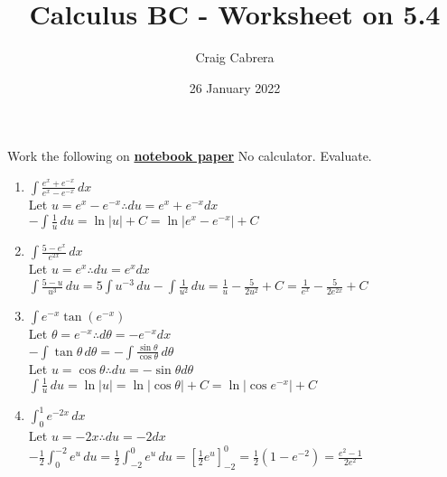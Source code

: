\documentclass[10pt, letterpaper]{report}
\title{Calculus BC - Worksheet on 5.4}
\author{Craig Cabrera}
\date{26 January 2022}
\begin{document}
\maketitle
\noindent Work the following on \textbf{\underline{notebook paper}} No calculator.
\noindent Evaluate.
\begin{enumerate}
  \item{$\int{\frac{e^{x}+e^{-x}}{e^{x}-e^{-x}}}\,dx$} \\

    Let $u=e^{x}-e^{-x}\therefore du=e^{x}+e^{-x}dx$ \\

    $-\int{\frac{1}{u}}\,du=\ln{|u|}+C=\ln{|e^{x}-e^{-x}|}+C$ \\

  \item{$\int{\frac{5-e^{x}}{e^{2x}}}\,dx$} \\

    Let $u=e^{x}\therefore du=e^{x}dx$ \\

    $\int{\frac{5-u}{u^{3}}}\,du=5\int{u^{-3}}\,du-\int{\frac{1}{u^{2}}}\,du=
    \frac{1}{u}-\frac{5}{2u^{2}}+C=\frac{1}{e^{x}}-\frac{5}{2e^{2x}}+C$ \\

  \item{$\int{e^{-x}\tan{(e^{-x})}}$} \\

    Let $\theta = e^{-x}\therefore d\theta=-e^{-x}dx$ \\

    $-\int{\tan{\theta}}\,d\theta=-\int{\frac{\sin{\theta}}{\cos{\theta}}}\,d\theta$ \\

    Let $u=\cos{\theta}\therefore du=-\sin{\theta}d\theta$ \\

    $\int{\frac{1}{u}}\,du=\ln{|u|}=\ln{|\cos{\theta}|}+C=\ln{|\cos{e^{-x}}|}+C$ \\

  \item{$\int_{0}^{1}{e^{-2x}}\,dx$} \\

    Let $u=-2x\therefore du=-2dx$ \\

    $-\frac{1}{2}\int_{0}^{-2}{e^{u}}\,du=\frac{1}{2}\int_{-2}^{0}{e^{u}}\,du=
    [\frac{1}{2}e^{u}]_{-2}^{0}=\frac{1}{2}(1-e^{-2})=\frac{e^{2}-1}{2e^{2}}$ \\


\end{enumerate}
\end{document}
